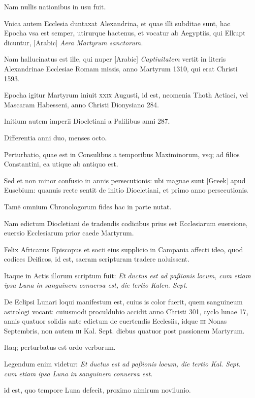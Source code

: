 \begin{parnumbers}
Nam
nullis nationibus in usu fuit.

Vnica autem Ecclesia duntaxat Alexandrina,
et quae illi subditae sunt, hac Epocha vsa est semper, utirurque
hactenus, et vocatur ab Aegyptiis, qui Elkupt dicuntur,
\textarabic{[Arabic]} \textit{Aera Martyrum sanctorum.}

Nam
hallucinatus est ille, qui nuper \textarabic{[Arabic]}
\textit{Captiuitatem} vertit in literis
Alexandrinae Ecclesiae Romam missis, anno Martyrum 1310, qui
erat Christi 1593.

Epocha igitur Martyrum iniuit \textsc{xxix} Augusti,
id est, neomenia Thoth Actiaci, vel Mascaram Habesseni, anno Christi
Dionysiano 284.

Initium autem imperii Diocletiani a Palilibus
anni 287.

Differentia anni duo, menses octo.

Perturbatio, quae est in
Consulibus a temporibus Maximinorum, vsq; ad filios Constantini,
ea utique ab antiquo est.

Sed et non minor confusio in annis persecutionis:
ubi magnae sunt \textgreek{[Greek]} apud Eusebium: quanuis
recte sentit de initio Diocletiani, et primo anno persecutionis.

Tamē
omnium Chronologorum fides hac in parte nutat.

Nam edictum
Diocletiani de tradendis codicibus prius est Ecclesiarum euersione,
euersio Ecclesiarum prior caede Martyrum.

Felix Africanus Episcopus
et socii eius supplicio in Campania affecti ideo, quod codices
Deificos, id est, sacram scripturam tradere noluissent.

Itaque in
Actis illorum scriptum fuit: \textit{Et ductus est ad paßionis locum, cum etiam
ipsa Luna in sanguinem conuersa est, die tertio Kalen. Sept.}

De Eclipsi
Lunari loqui manifestum est, cuius is color fuerit, quem sanguineum
astrologi vocant: cuiusmodi proculdubio accidit anno Christi
301, cyclo lunae 17, annis quatuor solidis ante edictum de euertendis
Ecclesiis, idque \textsc{iii} Nonas Septembris, non autem \textsc{iii} Kal.
Sept. diebus quatuor post passionem Martyrum.

Itaq; perturbatus
est ordo verborum.

Legendum enim videtur: \textit{Et ductus est ad paßionis
locum, die tertio Kal. Sept. cum etiam ipsa Luna in sanguinem conuersa
est.}

id est, quo tempore Luna defecit, proximo nimirum novilunio.


\end{parnumbers}
